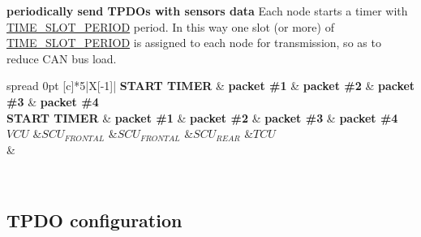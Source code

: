 \begin{DoxyEnumerate}
\item {\bfseries \label{_c_a_n_network_page_TPDO_Timer}%
%
periodically send T\+P\+D\+Os with sensors\textquotesingle{} data} Each node starts a timer with \mbox{\hyperlink{group___common__defines__group_ga09c95853fd002fab968d94c5bc44e823}{T\+I\+M\+E\+\_\+\+S\+L\+O\+T\+\_\+\+P\+E\+R\+I\+OD}} period. In this way one slot (or more) of \mbox{\hyperlink{group___common__defines__group_ga09c95853fd002fab968d94c5bc44e823}{T\+I\+M\+E\+\_\+\+S\+L\+O\+T\+\_\+\+P\+E\+R\+I\+OD}} is assigned to each node for transmission, so as to reduce C\+AN bus load.~\newline
~\newline
 \tabulinesep=1mm
\begin{longtabu} spread 0pt [c]{*{5}{|X[-1]}|}
\hline
\rowcolor{\tableheadbgcolor}\textbf{ S\+T\+A\+RT T\+I\+M\+ER  }&\textbf{ packet \#1  }&\textbf{ packet \#2  }&\textbf{ packet \#3  }&\textbf{ packet \#4   }\\
\endfirsthead
\hline
\endfoot
\hline
\rowcolor{\tableheadbgcolor}\textbf{ S\+T\+A\+RT T\+I\+M\+ER  }&\textbf{ packet \#1  }&\textbf{ packet \#2  }&\textbf{ packet \#3  }&\textbf{ packet \#4   }\\
\endhead
$VCU$  &$SCU_{FRONTAL}$  &$SCU_{FRONTAL}$  &$SCU_{REAR}$  &$TCU$   \\
&\\
\end{longtabu}
~\newline
 


\end{DoxyEnumerate}

\subsection*{\label{_c_a_n_network_page_TPDO_configuration}%
%
T\+P\+DO configuration}

